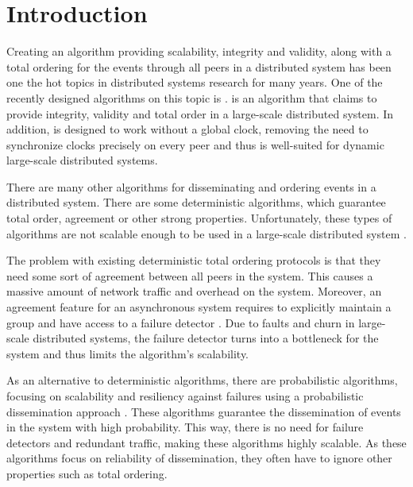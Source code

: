 \section{Introduction}

Creating an algorithm providing scalability, integrity and validity, along with a total ordering for the events through all peers in a distributed system has been one the hot topics in distributed systems research for many years. One of the recently designed algorithms on this topic is \epto \autocite{matos2015epto}. \epto is an algorithm that claims to provide integrity, validity and total order in a large-scale distributed system. In addition, \epto is designed to work without a global clock, removing the need to synchronize clocks precisely on every peer and thus is well-suited for dynamic large-scale distributed systems.
\par 
There are many other algorithms for disseminating and ordering events in a distributed system. There are some deterministic algorithms, which guarantee total order, agreement or other strong properties. Unfortunately, these types of algorithms are not scalable enough to be used in a large-scale distributed system \autocites[]{defago2004total}[]{lamport1978time}.
\par
The problem with existing deterministic total ordering protocols is that they need some sort of agreement between all peers in the system. This causes a massive amount of network traffic and overhead on the system.
Moreover, an agreement feature for an asynchronous system requires to
explicitly maintain a group and have access to a failure detector \autocites[]{chandra1996weakest}[]{chandra1996unreliable}. Due to faults and churn in large-scale distributed systems, the failure detector turns into a bottleneck for the system and thus limits the algorithm's scalability.
\par
As an alternative to deterministic algorithms, there are probabilistic algorithms, focusing on scalability and resiliency against failures using a probabilistic dissemination approach \autocites []{birman1999bimodal}[]{carvalho2007emergent}[]{demers1987epidemic}[]{eugster2003lightweight}[]{felber2002probabilistic}[]{hayden1996probabilistic}[]{kim2004gossip}[]{Koldehofe02simplegossiping}. These algorithms guarantee the dissemination of events in the system with high probability. This way, there is no need for failure detectors and redundant traffic, making these algorithms highly scalable. As these algorithms focus on reliability of dissemination, they often have to ignore other properties such as total ordering.
